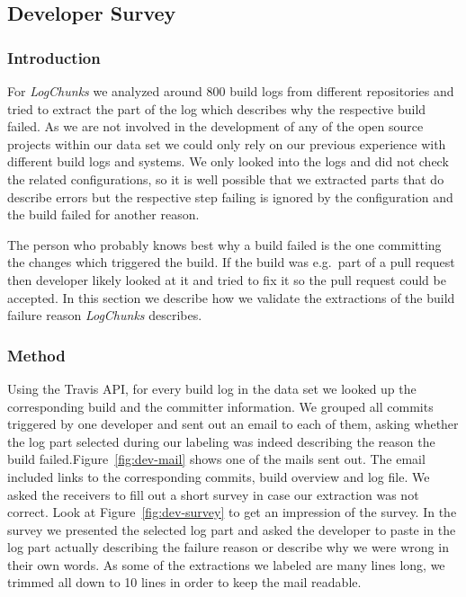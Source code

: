 \documentclass[\myrootdir/main.tex]{subfiles}
\begin{document}
\subsection{Developer Survey}
\subsubsection{Introduction}
For \emph{LogChunks} we analyzed around 800 build logs from different repositories and tried to extract the part of the log which describes why the respective build failed.
As we are not involved in the development of any of the open source projects within our data set we could only rely on our previous experience with different build logs and systems.
We only looked into the logs and did not check the related configurations, so it is well possible that we extracted parts that do describe errors but the respective step failing is ignored by the configuration and the build failed for another reason.

The person who probably knows best why a build failed is the one committing the changes which triggered the build.
If the build was e.g.\ part of a pull request then developer likely looked at it and tried to fix it so the pull request could be accepted.
In this section we describe how we validate the extractions of the build failure reason \emph{LogChunks} describes.
\subsubsection{Method}
Using the Travis API, for every build log in the data set we looked up the corresponding build and the committer information.
We grouped all commits triggered by one developer and sent out an email to each of them, asking whether the log part selected during our labeling was indeed describing the reason the build failed.Figure~\ref{fig:dev-mail} shows one of the mails sent out.
The email included links to the corresponding commits, build overview and log file.
We asked the receivers to fill out a short survey in case our extraction was not correct.
Look at Figure~\ref{fig:dev-survey} to get an impression of the survey.
In the survey we presented the selected log part and asked the developer to paste in the log part actually describing the failure reason or describe why we were wrong in their own words.
As some of the extractions we labeled are many lines long, we trimmed all down to 10 lines in order to keep the mail readable.
\end{document}

